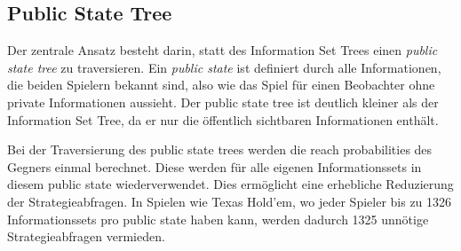 \subsection{Public State Tree}

Der zentrale Ansatz besteht darin, statt des Information Set Trees einen \emph{public state tree} zu traversieren.
Ein \emph{public state} ist definiert durch alle Informationen, die beiden Spielern bekannt sind, also wie das Spiel für einen Beobachter ohne private Informationen aussieht.
Der public state tree ist deutlich kleiner als der Information Set Tree, da er nur die öffentlich sichtbaren Informationen enthält.

Bei der Traversierung des public state trees werden die reach probabilities des Gegners einmal berechnet.
Diese werden für alle eigenen Informationssets in diesem public state wiederverwendet.
Dies ermöglicht eine erhebliche Reduzierung der Strategieabfragen.
In Spielen wie Texas Hold'em, wo jeder Spieler bis zu 1326 Informationssets pro public state haben kann, werden dadurch 1325 unnötige Strategieabfragen vermieden.
